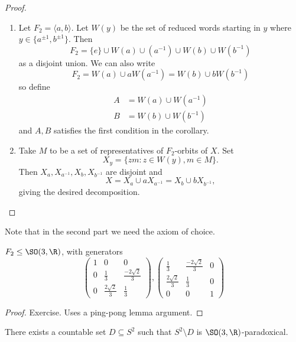 \documentclass[a4paper]{article}
\begin{document}
\begin{proof}\leavevmode
  \begin{enumerate}
  \item Let \(F_2 = \langle a, b\rangle\). Let \(W(y)\) be the set of reduced words starting in \(y\) where \(y \in \{a^{\pm 1}, b^{\pm 1}\}\). Then
    \[
      F_2 = \{e\} \cup W(a) \cup (a^{-1}) \cup W(b) \cup W(b^{-1})
    \]
    as a disjoint union. We can also write
    \[
      F_2 = W(a) \cup aW(a^{-1}) = W(b) \cup bW(b^{-1})
    \]
    so define
    \begin{align*}
      A &= W(a) \cup W(a^{-1}) \\
      B &= W(b) \cup W(b^{-1})
    \end{align*}
    and \(A, B\) satisfies the first condition in the corollary.
  \item Take \(M\) to be a set of representatives of \(F_2\)-orbits of \(X\). Set
    \[
      X_y = \{zm: z \in W(y), m \in M\}.
    \]
    Then \(X_a, X_{a^{-1}}, X_b, X_{b^{-1}}\) are disjoint and
    \[
      X = X_a \cup aX_{a^{-1}} = X_b \cup bX_{b^{-1}},
    \]
    giving the desired decomposition.
  \end{enumerate}
\end{proof}

Note that in the second part we need the axiom of choice.

\begin{proposition}
  \(F_2 \leq \SO(3, \R)\), with generators
  \[
    \begin{pmatrix}
      1 & 0 & 0 \\
      0 & \frac{1}{3} & \frac{-2\sqrt 2}{3} \\
      0 & \frac{2\sqrt{2}}{3} & \frac{1}{3}
    \end{pmatrix},
    \begin{pmatrix}
      \frac{1}{3} & \frac{-2\sqrt 2}{3} & 0 \\
      \frac{2\sqrt 2}{3} & \frac{1}{3} & 0 \\
      0 & 0 & 1
    \end{pmatrix}
  \]
\end{proposition}

\begin{proof}
  Exercise. Uses a ping-pong lemma argument.
\end{proof}

\begin{theorem}
  There exists a countable set \(D \subseteq S^2\) such that \(S^2 \setminus D\) is \(\SO(3, \R)\)-paradoxical.
\end{theorem}
\end{document}
